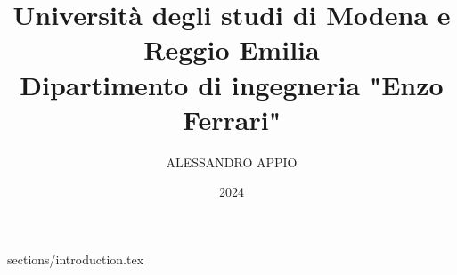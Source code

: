\documentclass{article}
\title{Università degli studi di Modena e Reggio Emilia\\
        Dipartimento di ingegneria "Enzo Ferrari"}
\author{ALESSANDRO APPIO}
\date{2024}
\begin{document}


 {sections/introduction.tex}
\end{document}
